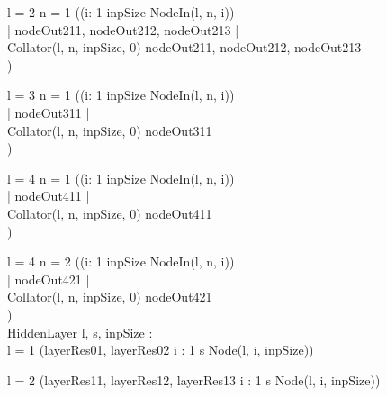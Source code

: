 \documentclass{article}
\begin{document}
\begin{figure}[p]
\begin{circus}
        \lcircguard l = 2 \land n = 1 \rcircguard \circguard
        ((\Interleave i: 1 \upto inpSize \circspot NodeIn(l, n, i)) \\%
        \lpar | \lchanset nodeOut211, nodeOut212, nodeOut213 \rchanset | \rpar \\%
        Collator(l, n, inpSize, 0) \circhide \lchanset nodeOut211, nodeOut212, nodeOut213 \rchanset \\   
        ) \\
        \extchoice
        
        \lcircguard l = 3 \land n = 1 \rcircguard \circguard
        ((\Interleave i: 1 \upto inpSize \circspot NodeIn(l, n, i)) \\%
        \lpar | \lchanset nodeOut311 \rchanset | \rpar \\%
        Collator(l, n, inpSize, 0) \circhide \lchanset nodeOut311 \rchanset \\   
        ) \\
        \extchoice
        
         \lcircguard l = 4 \land n = 1 \rcircguard \circguard
        ((\Interleave i: 1 \upto inpSize \circspot NodeIn(l, n, i)) \\%
        \lpar | \lchanset nodeOut411 \rchanset | \rpar \\%
        Collator(l, n, inpSize, 0) \circhide \lchanset nodeOut411 \rchanset \\   
        ) \\
        \extchoice
        
         \lcircguard l = 4 \land n = 2 \rcircguard \circguard
        ((\Interleave i: 1 \upto inpSize \circspot NodeIn(l, n, i)) \\%
        \lpar | \lchanset nodeOut421 \rchanset | \rpar \\%
        Collator(l, n, inpSize, 0) \circhide \lchanset nodeOut421 \rchanset \\   
        ) \\
        
        
      HiddenLayer \circdef l, s, inpSize : \nat \circspot \\%
      \lcircguard l = 1 \rcircguard \circguard
      (\lpar \lchanset layerRes01, layerRes02 \rchanset \rpar i : 1 \upto s \circspot Node(l, i, inpSize)) \\%
      \extchoice 
      
      \lcircguard l = 2 \rcircguard \circguard
      (\lpar \lchanset layerRes11, layerRes12, layerRes13 \rchanset \rpar i : 1 \upto s \circspot Node(l, i, inpSize)) \\%
      \extchoice 
      

\end{circus}
\end{figure}
\end{document}
